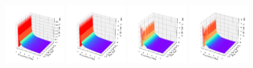 \documentclass[a4paper]{article}
\begin{document}
\begin{figure}[H]
  \centering
  \includegraphics[width=0.23\textwidth]{cond3d_imag-A3-v5-imp0.pdf}
  \includegraphics[width=0.23\textwidth]{cond3d_imag-A3-v5-imp1.pdf}
  \includegraphics[width=0.23\textwidth]{cond3d_imag-A3-v5-imp2.pdf}
  \includegraphics[width=0.23\textwidth]{cond3d_imag-A3-v5-imp3.pdf}
\end{figure}
\end{document}
